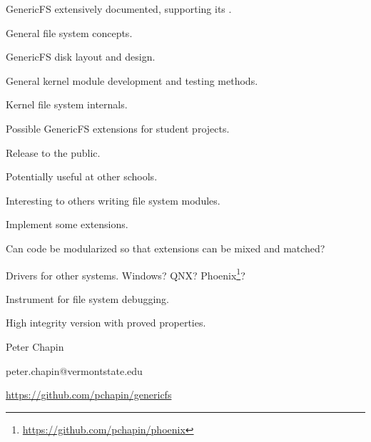 \documentclass[landscape]{slides}
\begin{document}

GenericFS extensively documented, supporting its .

\begin{citemize}
\item General file system concepts.
\item GenericFS disk layout and design.
\item General kernel module development and testing methods.
\item Kernel file system internals.
\item Possible GenericFS extensions for student projects.
\end{citemize}
\stopslide


\begin{citemize}
\item Release to the public.
\begin{citemize}
\item Potentially useful at other schools.
\item Interesting to others writing file system modules.
\end{citemize}

\item Implement some extensions.
\begin{citemize}
\item Can code be modularized so that extensions can be mixed and matched?
\end{citemize}

\item Drivers for other systems. Windows? QNX?
  Phoenix\footnote{\url{https://github.com/pchapin/phoenix}}?
\item Instrument for file system debugging.
\item High integrity version with proved properties.
\end{citemize}
\stopslide


\centerline{Peter Chapin}
\makeatletter
\centerline{peter.chapin@vermontstate.edu}
\makeatother
\centerline{\url{https://github.com/pchapin/genericfs}}
\stopslide
\end{document}
